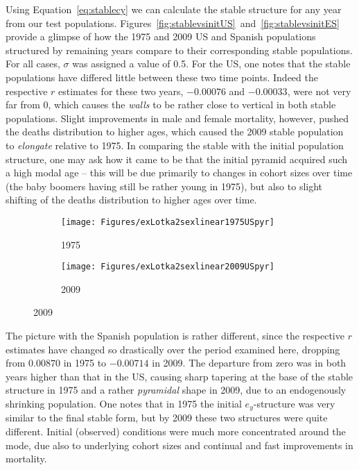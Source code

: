  \FloatBarrier
\label{sec:ex2sexdomweightsstabstruct}
Using Equation~\eqref{eq:stablecy} we can calculate the
stable structure for any year from our test populations.
Figures~\ref{fig:stablevsinitUS}~and~\ref{fig:stablevsinitES} provide a glimpse
of how the 1975 and 2009 US and Spanish populations structured by remaining
years compare to their corresponding stable populations. For all cases,
$\sigma$ was assigned a value of 0.5. For the US, one notes that the stable
populations have differed little between these two time points. Indeed the
respective $r$ estimates for these two years, $-0.00076$ and $-0.00033$, were 
not very far from 0, which causes the \textit{walls} to be rather close to vertical in both
stable populations. Slight improvements in male and female mortality, however,
pushed the deaths distribution to higher ages, which caused the 2009 stable
population to \textit{elongate} relative to 1975. In comparing the stable with the initial
population structure, one may ask how it came to be that the initial pyramid
acquired such a high modal age -- this will be due primarily to changes in
cohort sizes over time (the baby boomers having still be rather young in 1975),
but also to slight shifting of the deaths distribution to higher ages over
time.
 
\begin{figure}[!ht]
   \caption{US, stable ($\sigma = 0.05$) versus initial $e_y$-structures, 1975
   and 2009}
   \label{fig:stablevsinitUS}
        \centering
        \begin{subfigure}
                \centering
                \caption*{1975}
                \texttt{[image: Figures/exLotka2sexlinear1975USpyr]}
        \end{subfigure}
        \begin{subfigure}
                \centering
                \caption*{2009}
                \texttt{[image: Figures/exLotka2sexlinear2009USpyr]}
        \end{subfigure}
\end{figure}
 
The picture with the Spanish population is rather different, since the
respective $r$ estimates have changed so drastically over the period examined
here, dropping from $0.00870$ in 1975 to $-0.00714$ in 2009. The departure from
zero was in both years higher than that in the US, causing sharp tapering at the
base of the stable structure in 1975 and a rather \textit{pyramidal} shape in
2009, due to an endogenously shrinking population. One notes that in 1975 the
initial $e_y$-structure was very similar to the final stable form, but by 2009
these two structures were quite different. Initial (observed)
conditions were much more concentrated around the mode, due also to underlying
cohort sizes and continual and fast improvements in mortality.
 
